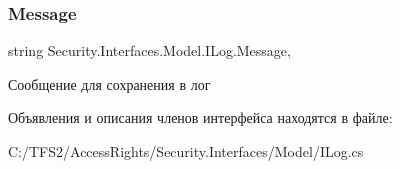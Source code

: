\subsubsection{\texorpdfstring{Message}{Message}}
{\footnotesize\ttfamily string Security.\+Interfaces.\+Model.\+I\+Log.\+Message\hspace{0.3cm}{\ttfamily [get]}, {\ttfamily [set]}}



Сообщение для сохранения в лог 



Объявления и описания членов интерфейса находятся в файле\+:\begin{DoxyCompactItemize}
\item 
C\+:/\+T\+F\+S2/\+Access\+Rights/\+Security.\+Interfaces/\+Model/I\+Log.\+cs\end{DoxyCompactItemize}
